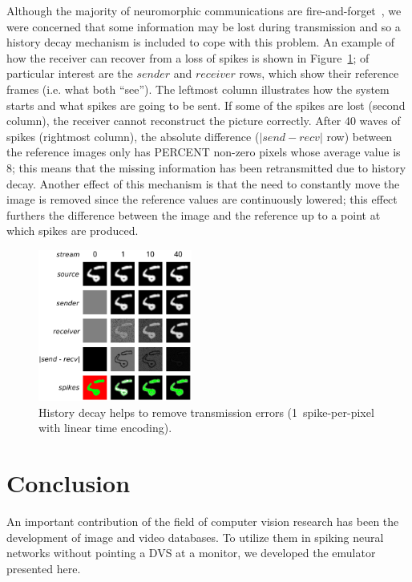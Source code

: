 \documentclass[conference]{IEEEtran}
\begin{document}

Although the majority of neuromorphic communications are fire-and-forget~\cite{Rast2015}, we were concerned that some information may be lost during transmission and so a history decay mechanism is included to cope with this problem. An example of how the receiver can recover from a loss of spikes is shown in Figure~\ref{fig:history_decay}; of particular interest are the $sender$ and $receiver$ rows, which show their reference frames (i.e. what both ``see''). The leftmost column illustrates how the system starts and what spikes are going to be sent. 
If some of the spikes are lost (second column), the receiver cannot reconstruct the picture correctly. After 40 waves of spikes (rightmost column), the absolute difference ($|send-recv|$ row) between the reference images only has PERCENT non-zero pixels whose average value is 8; this means that the missing information has been retransmitted due to history decay. Another effect of this mechanism is that the need to constantly move the image is removed since the reference values are continuously lowered; this effect furthers the difference between the image and the reference up to a point at which spikes are produced.

\begin{figure}[htb]
  \centering
  
  \includegraphics[width=0.45\textwidth]{history_decay}
  \caption{History decay helps to remove transmission errors (1~spike-per-pixel with linear time encoding).}
  \label{fig:history_decay}
\end{figure}


\section{Conclusion}
\label{sec:conclusions}
An important contribution of the field of computer vision research has been the development of image and video databases. To utilize them in spiking neural networks without pointing a DVS at a monitor, we developed the emulator presented here. 
\end{document}
